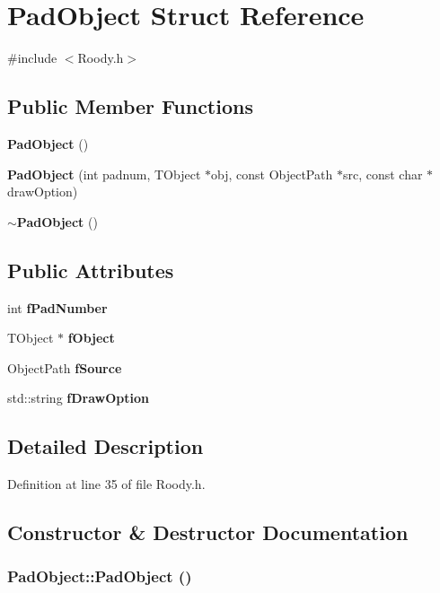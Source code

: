 \section{PadObject Struct Reference}
\label{structPadObject}


{\ttfamily \#include $<$Roody.h$>$}\subsection*{Public Member Functions}
\begin{DoxyCompactItemize}
\item 
{\bf PadObject} ()
\item 
{\bf PadObject} (int padnum, TObject $\ast$obj, const ObjectPath $\ast$src, const char $\ast$drawOption)
\item 
{\bf $\sim$PadObject} ()
\end{DoxyCompactItemize}
\subsection*{Public Attributes}
\begin{DoxyCompactItemize}
\item 
int {\bf fPadNumber}
\item 
TObject $\ast$ {\bf fObject}
\item 
ObjectPath {\bf fSource}
\item 
std::string {\bf fDrawOption}
\end{DoxyCompactItemize}


\subsection{Detailed Description}


Definition at line 35 of file Roody.h.

\subsection{Constructor \& Destructor Documentation}
\subsubsection[{PadObject}]{\setlength{\rightskip}{0pt plus 5cm}PadObject::PadObject ()\hspace{0.3cm}{\ttfamily  [inline]}}\label{structPadObject_a0af56a6cdb687fda40758711e7117d37}


